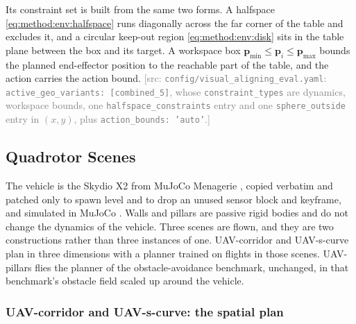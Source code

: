 \documentclass[headsepline,footsepline,footinclude=false,oneside,fontsize=11pt,paper=a4,listof=totoc,bibliography=totoc]{scrbook}
\theoremstyle{definition}
\theoremstyle{plain}
\theoremstyle{remark}
\newcommand{\vect}[1]{\boldsymbol{#1}}
\newcommand{\sidx}[1]{_{\textrm{#1}}}
\newif\ifsubmission
\newcommand{\srcnote}[1]{\ifsubmission\else\textcolor{gray}{\footnotesize\textsf{[src: #1]}}\fi}
\begin{document}
Its constraint set is built from the same two forms. A halfspace
\eqref{eq:method:env:halfspace} runs diagonally across the far corner of the table and excludes it,
and a circular keep-out region \eqref{eq:method:env:disk} sits in the table plane between the box
and its target. A workspace box $\vect{p}\sidx{min}\le\vect{p}_{i}\le\vect{p}\sidx{max}$ bounds the
planned end-effector position to the reachable part of the table, and the action carries the action
bound.
\srcnote{\texttt{config/visual\_aligning\_eval.yaml}: \texttt{active\_geo\_variants:
[combined\_5]}, whose \texttt{constraint\_types} are dynamics, workspace bounds, one
\texttt{halfspace\_constraints} entry and one \texttt{sphere\_outside} entry in
$(x,y)$, plus \texttt{action\_bounds: 'auto'}.}

\subsection{Quadrotor Scenes}\label{sec:method:env:uav}

The vehicle is the Skydio X2 from MuJoCo Menagerie \parencite{zakka2022menagerie}, copied verbatim and
patched only to spawn level and to drop an unused sensor block and keyframe, and simulated in MuJoCo
\parencite{todorov2012mujoco}. Walls and pillars are passive rigid bodies and do not change the dynamics
of the vehicle. Three scenes are flown, and they are two constructions rather than three instances of
one. UAV-corridor and UAV-s-curve plan in three dimensions with a planner trained on flights in those
scenes. UAV-pillars flies the planner of the obstacle-avoidance benchmark, unchanged, in that
benchmark's obstacle field scaled up around the vehicle.

\subsubsection*{UAV-corridor and UAV-s-curve: the spatial plan}
\end{document}
